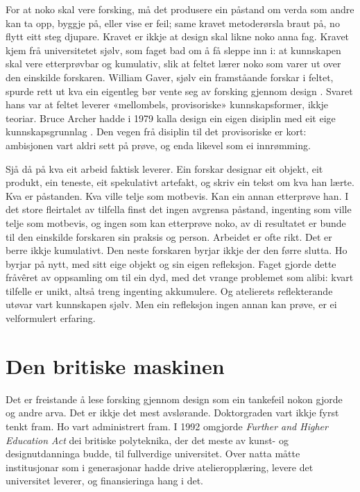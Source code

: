For at noko skal vere forsking, må det produsere ein påstand om verda som andre kan ta opp, byggje på, eller vise er feil; same kravet metoderørsla braut på, no flytt eitt steg djupare. Kravet er ikkje at design skal likne noko anna fag. Kravet kjem frå universitetet sjølv, som faget bad om å få sleppe inn i: at kunnskapen skal vere etterprøvbar og kumulativ, slik at feltet lærer noko som varer ut over den einskilde forskaren. William Gaver, sjølv ein framståande forskar i feltet, spurde rett ut kva ein eigentleg bør vente seg av forsking gjennom design \autocite{gaver2012what}. Svaret hans var at feltet leverer «mellombels, provisoriske» kunnskapsformer, ikkje teoriar. Bruce Archer hadde i 1979 kalla design ein eigen disiplin med eit eige kunnskapsgrunnlag \autocite{archer1979discipline}. Den vegen frå disiplin til det provisoriske er kort: ambisjonen vart aldri sett på prøve, og enda likevel som ei innrømming.

Sjå då på kva eit arbeid faktisk leverer. Ein forskar designar eit objekt, eit produkt, ein teneste, eit spekulativt artefakt, og skriv ein tekst om kva han lærte. Kva er påstanden. Kva ville telje som motbevis. Kan ein annan etterprøve han. I det store fleirtalet av tilfella finst det ingen avgrensa påstand, ingenting som ville telje som motbevis, og ingen som kan etterprøve noko, av di resultatet er bunde til den einskilde forskaren sin praksis og person. Arbeidet er ofte rikt. Det er berre ikkje kumulativt. Den neste forskaren byrjar ikkje der den førre slutta. Ho byrjar på nytt, med sitt eige objekt og sin eigen refleksjon. Faget gjorde dette fråvêret av oppsamling om til ein dyd, med det vrange problemet \autocite{buchanan1992wicked} som alibi: kvart tilfelle er unikt, altså treng ingenting akkumulere. Og atelierets reflekterande utøvar \autocite{schon1983} vart kunnskapen sjølv. Men ein refleksjon ingen annan kan prøve, er ei velformulert erfaring.

\section{Den britiske maskinen}

Det er freistande å lese forsking gjennom design som ein tankefeil nokon gjorde og andre arva. Det er ikkje det mest avslørande. Doktorgraden vart ikkje fyrst tenkt fram. Ho vart administrert fram. I 1992 omgjorde \textit{Further and Higher Education Act} dei britiske polyteknika, der det meste av kunst- og designutdanninga budde, til fullverdige universitet. Over natta måtte institusjonar som i generasjonar hadde drive atelieropplæring, levere det universitet leverer, og finansieringa hang i det.

